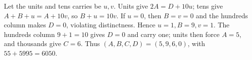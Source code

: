 Let the units and tens carries be $u,v$. Units give $2A=D+10u$; tens give $A+B+u=A+10v$, so $B+u=10v$. If $u=0$, then $B=v=0$ and the hundreds column makes $D=0$, violating distinctness. Hence $u=1,B=9,v=1$. The hundreds column $9+1=10$ gives $D=0$ and carry one; units then force $A=5$, and thousands give $C=6$. Thus $\boxed{(A,B,C,D)=(5,9,6,0)}$, with $55+5995=6050$.
